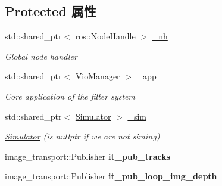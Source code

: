 \subsection*{Protected 属性}
\begin{DoxyCompactItemize}
\item 
\mbox{\label{classov__msckf_1_1ROS1Visualizer_a5888fecd6f5e2505b9bc68b3e0d1bba0}} 
std\+::shared\+\_\+ptr$<$ ros\+::\+Node\+Handle $>$ \hyperlink{classov__msckf_1_1ROS1Visualizer_a5888fecd6f5e2505b9bc68b3e0d1bba0}{\+\_\+nh}
\begin{DoxyCompactList}\small\item\em Global node handler \end{DoxyCompactList}\item 
\mbox{\label{classov__msckf_1_1ROS1Visualizer_a94f9aec2778d9739fa35391174e4215f}} 
std\+::shared\+\_\+ptr$<$ \hyperlink{classov__msckf_1_1VioManager}{Vio\+Manager} $>$ \hyperlink{classov__msckf_1_1ROS1Visualizer_a94f9aec2778d9739fa35391174e4215f}{\+\_\+app}
\begin{DoxyCompactList}\small\item\em Core application of the filter system \end{DoxyCompactList}\item 
\mbox{\label{classov__msckf_1_1ROS1Visualizer_a3e28ea010550b2bbf938d505b172ba42}} 
std\+::shared\+\_\+ptr$<$ \hyperlink{classov__msckf_1_1Simulator}{Simulator} $>$ \hyperlink{classov__msckf_1_1ROS1Visualizer_a3e28ea010550b2bbf938d505b172ba42}{\+\_\+sim}
\begin{DoxyCompactList}\small\item\em \hyperlink{classov__msckf_1_1Simulator}{Simulator} (is nullptr if we are not sim\textquotesingle{}ing) \end{DoxyCompactList}\item 
\mbox{\label{classov__msckf_1_1ROS1Visualizer_aaee7e3fcfb1908ed245e04352810dbc3}} 
image\+\_\+transport\+::\+Publisher {\bfseries it\+\_\+pub\+\_\+tracks}
\item 
\mbox{\label{classov__msckf_1_1ROS1Visualizer_a6cb7aa0db30322fd15f128ee1eb3b234}} 
image\+\_\+transport\+::\+Publisher {\bfseries it\+\_\+pub\+\_\+loop\+\_\+img\+\_\+depth}

\end{DoxyCompactItemize}
